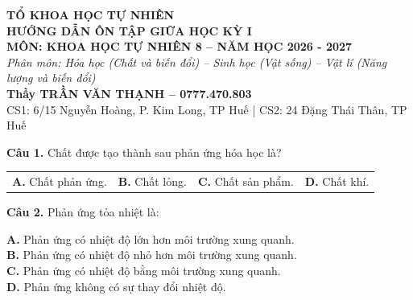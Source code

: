 \documentclass{article}
\begin{document}

\begin{center}
\vspace*{0.6cm}
{\fontsize{24}{30}\selectfont \textbf{TỔ KHOA HỌC TỰ NHIÊN}}\\[0.6cm]
{\fontsize{34}{42}\selectfont \textbf{\color{brandGreen}HƯỚNG DẪN ÔN TẬP GIỮA HỌC KỲ I}}\\[0.4cm]
{\fontsize{28}{36}\selectfont \textbf{MÔN: KHOA HỌC TỰ NHIÊN 8 -- NĂM HỌC 2026 - 2027}}\\[1.0cm]
{\fontsize{24}{32}\selectfont \textit{Phân môn: Hóa học (Chất và biến đổi) -- Sinh học (Vật sống) -- Vật lí (Năng lượng và biến đổi)}}\\[1.2cm]
{\fontsize{24}{30}\selectfont \textbf{\color{brandRed}Thầy TRẦN VĂN THẠNH -- 0777.470.803}}\\[0.3cm]
{\fontsize{20}{26}\selectfont CS1: 6/15 Nguyễn Hoàng, P. Kim Long, TP Huế \quad | \quad CS2: 24 Đặng Thái Thân, TP Huế}
\end{center}
\newpage


\fontsize{26}{34}\selectfont
\textbf{Câu 1.} Chất được tạo thành sau phản ứng hóa học là?
\vspace{6pt}

\begin{tabularx}{\linewidth}{@{}X X X X@{}}
\textbf{A.} Chất phản ứng. & \textbf{B.} Chất lỏng. & \textbf{C.} Chất sản phẩm. & \textbf{D.} Chất khí.
\end{tabularx}

\vspace*{\fill}

\textbf{Câu 2.} Phản ứng tỏa nhiệt là:
\vspace{6pt}

\textbf{A.} Phản ứng có nhiệt độ lớn hơn môi trường xung quanh.\\
\textbf{B.} Phản ứng có nhiệt độ nhỏ hơn môi trường xung quanh.\\
\textbf{C.} Phản ứng có nhiệt độ bằng môi trường xung quanh.\\
\textbf{D.} Phản ứng không có sự thay đổi nhiệt độ.
\vspace*{\fill}
\newpage
\end{document}
